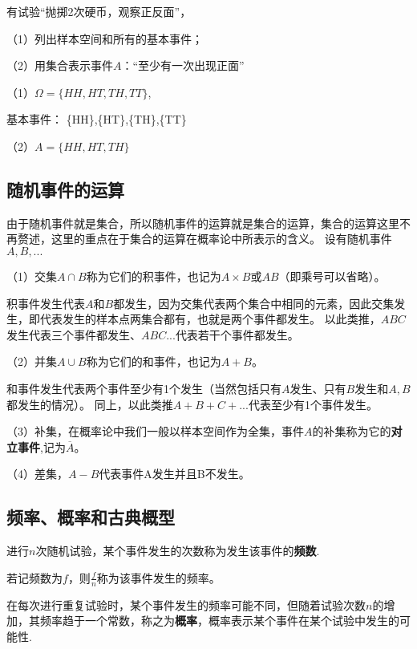 \begin{example}
    有试验“抛掷2次硬币，观察正反面”，
    
    （1）列出样本空间和所有的基本事件；
    
    （2）用集合表示事件$A$：“至少有一次出现正面”
\end{example}

\begin{solution}
    （1）$\Omega=\{HH,HT,TH,TT\}$,

    基本事件：
    \{HH\},\{HT\},\{TH\},\{TT\}

    （2）$A=\{HH,HT,TH\}$
\end{solution}

\subsection{随机事件的运算}
由于随机事件就是集合，所以随机事件的运算就是集合的运算，集合的运算这里不再赘述，这里的重点在于集合的运算在概率论中所表示的含义。
设有随机事件$A,B,...$

（1）交集$A \cap B$称为它们的积事件，也记为$A \times B$或$AB$（即乘号可以省略）。

积事件发生代表$A$和$B$都发生，因为交集代表两个集合中相同的元素，因此交集发生，即代表发生的样本点两集合都有，也就是两个事件都发生。
以此类推，$ABC$发生代表三个事件都发生、$ABC...$代表若干个事件都发生。

（2）并集$A \cup B$称为它们的和事件，也记为$A+B$。

和事件发生代表两个事件至少有1个发生（当然包括只有$A$发生、只有$B$发生和$A,B$都发生的情况）。
同上，以此类推$A+B+C+...$代表至少有1个事件发生。

（3）补集，在概率论中我们一般以样本空间作为全集，事件$A$的补集称为它的\textbf{对立事件},记为$\overline{A}$。

（4）差集，$A-B$代表事件A发生并且B不发生。

\subsection{频率、概率和古典概型}
\begin{definition}
    进行$n$次随机试验，某个事件发生的次数称为发生该事件的\textbf{频数}.

    若记频数为$f$，则$\frac{f}{n}$称为该事件发生的频率。
\end{definition}

在每次进行重复试验时，某个事件发生的频率可能不同，但随着试验次数$n$的增加，其频率趋于一个常数，称之为\textbf{概率}，概率表示某个事件在某个试验中发生的可能性.

